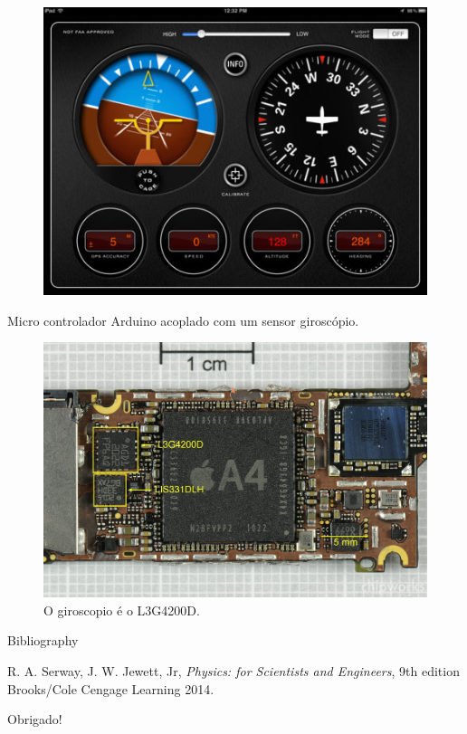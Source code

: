 \documentclass{beamer}
\begin{document}
\begin{frame}
\begin{figure}
\includegraphics[width=3.5 in]{figuras/aviao.jpg}
\end{figure}
Micro controlador Arduino acoplado com um sensor giroscópio.
\end{frame}



\begin{frame}
\begin{figure}
\includegraphics[width=3.7 in]{figuras/giroscopio_iphone.jpg}
\caption{O giroscopio é o L3G4200D.}
\end{figure}
\end{frame}







\begin{thebibliography}{9}

      \begin{frame}[label=bibliography]{Bibliography}
      
 R. A. Serway, J. W. Jewett, Jr, \textit{Physics: for Scientists and Engineers}, 9th edition Brooks/Cole Cengage Learning 2014.

    \end{frame}
    \end{thebibliography}

\begin{frame}
\Huge{\centerline{Obrigado!}}
\end{frame}


\fi
\end{document}

